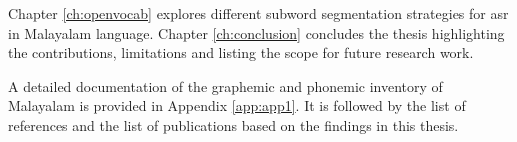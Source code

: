 


Chapter \ref{ch:openvocab} explores different
subword segmentation strategies for \gls{asr} in Malayalam
language. Chapter \ref{ch:conclusion} concludes the thesis highlighting the
contributions, limitations and listing the scope for future research work.

A detailed documentation of the graphemic and phonemic inventory of Malayalam is provided in Appendix \ref{app:app1}.
It is followed by the list of references and the list of publications based on the findings in this thesis. 